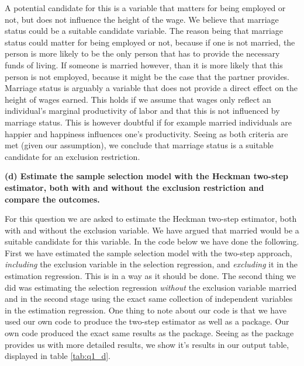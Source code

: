 \documentclass[
]{article}
\begin{document}
A potential candidate for this is a variable that matters for being
employed or not, but does not influence the height of the wage. We
believe that marriage status could be a suitable candidate variable. The
reason being that marriage status could matter for being employed or
not, because if one is not married, the person is more likely to be the
only person that has to provide the necessary funds of living. If
someone is married however, than it is more likely that this person is
not employed, because it might be the case that the partner provides.
Marriage status is arguably a variable that does not provide a direct
effect on the height of wages earned. This holds if we assume that wages
only reflect an individual's marginal productivity of labor and that
this is not influenced by marriage status. This is however doubtful if
for example married individuals are happier and happiness influences
one's productivity. Seeing as both criteria are met (given our
assumption), we conclude that marriage status is a suitable candidate
for an exclusion restriction.

\textbf{(d) Estimate the sample selection model with the Heckman
two-step estimator, both with and without the exclusion restriction and
compare the outcomes.}

For this question we are asked to estimate the Heckman two-step
estimator, both with and without the exclusion variable. We have argued
that married would be a suitable candidate for this variable. In the
code below we have done the following. First we have estimated the
sample selection model with the two-step approach, \emph{including} the
exclusion variable in the selection regression, and \emph{excluding} it
in the estimation regression. This is in a way as it should be done. The
second thing we did was estimating the selection regression
\emph{without} the exclusion variable married and in the second stage
using the exact same collection of independent variables in the
estimation regression. One thing to note about our code is that we have
used our own code to produce the two-step estimator as well as a
package. Our own code produced the exact same results as the package.
Seeing as the package provides us with more detailed results, we show
it's results in our output table, displayed in table \ref{tab:q1_d}.
\end{document}
